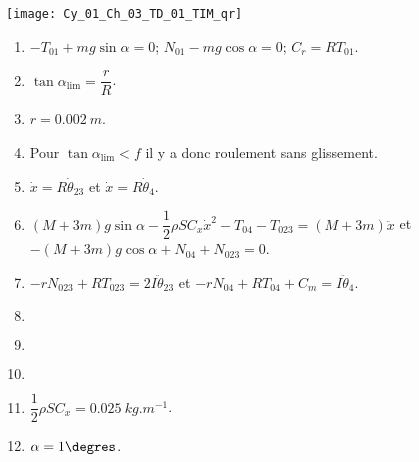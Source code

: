 \ifprof

\begin{corrige}
\end{corrige}
\else
\fi




\ifprof
\else
\begin{marginfigure}
\centering
\texttt{[image: Cy\_01\_Ch\_03\_TD\_01\_TIM\_qr]}
\end{marginfigure}
\fi


\ifprof
\else
\ifcolle
\else
\begin{solution}
\begin{enumerate}
\item $-T_{01} +mg\sin\alpha = 0$; $N_{01} -mg\cos\alpha = 0$; $C_r=RT_{01}$.
\item $\tan \alpha_{\text{lim}} = \dfrac{r}{R}$.
\item $r=\SI{0,002}{m}$.
\item Pour $\tan \alpha_{\text{lim}}<f$ il y a donc roulement sans glissement.
\item $\dot{x}=R \dot{\theta}_{23}$ et $\dot{x}=R \dot{\theta}_{4} $.
\item $\left(M+3m\right)g\sin \alpha -\dfrac{1}{2}\rho S C_x \dot{x}^2-T_{04}-T_{023}=\left(M+3m\right)\ddot{x}$ et $-\left(M+3m\right)g \cos \alpha +N_{04}+N_{023}=0$.
\item $-rN_{023}+RT_{023}=2I\ddot{\theta}_{23}$ et $-rN_{04}+RT_{04}+C_m=I\ddot{\theta}_{4}$.
\item $\,$
\item $\,$
\item $\,$
\item $\dfrac{1}{2}\rho S C_x = \SI{0,025}{kg.m^{-1}}$.
\item $\alpha=1\degres$.
\end{enumerate}
\end{solution}%
\fi
\fi


